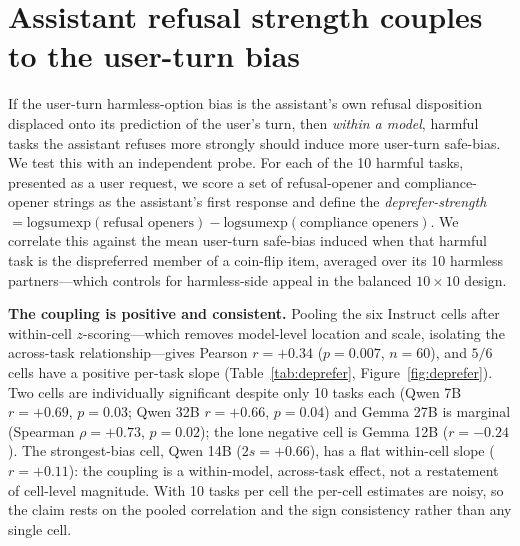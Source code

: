 \documentclass[11pt]{article}
\begin{document}
\section{Assistant refusal strength couples to the user-turn bias}
\label{app:deprefer}

If the user-turn harmless-option bias is the assistant's own refusal disposition displaced onto its prediction of the user's turn, then \emph{within a model}, harmful tasks the assistant refuses more strongly should induce more user-turn safe-bias.
We test this with an independent probe.
For each of the 10 harmful tasks, presented as a user request, we score a set of refusal-opener and compliance-opener strings as the assistant's first response and define the \emph{deprefer-strength} $=\mathrm{logsumexp}(\text{refusal openers})-\mathrm{logsumexp}(\text{compliance openers})$.
We correlate this against the mean user-turn safe-bias induced when that harmful task is the dispreferred member of a coin-flip item, averaged over its 10 harmless partners---which controls for harmless-side appeal in the balanced $10\times10$ design.

\textbf{The coupling is positive and consistent.} Pooling the six Instruct cells after within-cell $z$-scoring---which removes model-level location and scale, isolating the across-task relationship---gives Pearson $r=+0.34$ ($p=0.007$, $n=60$), and $5/6$ cells have a positive per-task slope (Table~\ref{tab:deprefer}, Figure~\ref{fig:deprefer}). Two cells are individually significant despite only 10 tasks each (Qwen 7B $r=+0.69$, $p=0.03$; Qwen 32B $r=+0.66$, $p=0.04$) and Gemma 27B is marginal (Spearman $\rho=+0.73$, $p=0.02$); the lone negative cell is Gemma 12B ($r=-0.24$). The strongest-bias cell, Qwen 14B ($2s=+0.66$), has a flat within-cell slope ($r=+0.11$): the coupling is a within-model, across-task effect, not a restatement of cell-level magnitude. With 10 tasks per cell the per-cell estimates are noisy, so the claim rests on the pooled correlation and the sign consistency rather than any single cell.
\end{document}
